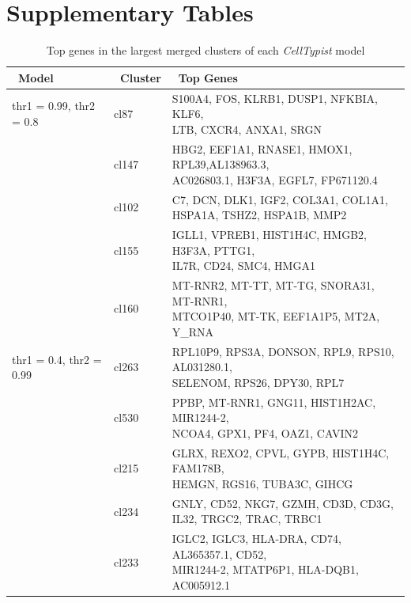 \section{Supplementary Tables}
\label{sectionB1.2}

\begin{table}[ht!] %
\footnotesize
\caption[Top genes in the largest merged clusters of each \textit{CellTypist} model]{Top genes in the largest merged clusters of each \textit{CellTypist} model}
\centering
\label{table:tab_appB_clgenes}

\begin{tabular}{l|l|l}
\toprule
~\textbf{Model} & ~\textbf{Cluster} & ~\textbf{Top Genes} \\
\midrule
thr1 = 0.99, thr2 = 0.8 & cl87 & \specialcell[t]{S100A4, FOS, KLRB1, DUSP1, NFKBIA, KLF6,\\LTB, CXCR4, ANXA1, SRGN} \\
 & cl147 & \specialcell[t]{HBG2, EEF1A1, RNASE1, HMOX1, RPL39,AL138963.3,\\AC026803.1, H3F3A, EGFL7, FP671120.4}  \\
 & cl102 & \specialcell[t]{C7, DCN, DLK1, IGF2, COL3A1, COL1A1,\\HSPA1A, TSHZ2, HSPA1B, MMP2} \\
 & cl155 & \specialcell[t]{IGLL1, VPREB1, HIST1H4C, HMGB2, H3F3A, PTTG1,\\IL7R, CD24, SMC4, HMGA1} \\
 & cl160 & \specialcell[t]{MT-RNR2, MT-TT, MT-TG, SNORA31, MT-RNR1,\\MTCO1P40, MT-TK, EEF1A1P5, MT2A, Y\_RNA} \\
 
\midrule
thr1 = 0.4, thr2 = 0.99 & cl263 & \specialcell[t]{RPL10P9, RPS3A, DONSON, RPL9, RPS10, AL031280.1,\\SELENOM, RPS26, DPY30, RPL7}  \\
 & cl530 & \specialcell[t]{PPBP, MT-RNR1, GNG11, HIST1H2AC, MIR1244-2,\\NCOA4, GPX1, PF4, OAZ1, CAVIN2}  \\
 & cl215 & \specialcell[t]{GLRX, REXO2, CPVL, GYPB, HIST1H4C, FAM178B,\\HEMGN, RGS16, TUBA3C, GIHCG}  \\
 & cl234 & \specialcell[t]{GNLY, CD52, NKG7, GZMH, CD3D, CD3G,\\IL32, TRGC2, TRAC, TRBC1}  \\
 & cl233 & \specialcell[t]{IGLC2, IGLC3, HLA-DRA, CD74, AL365357.1, CD52,\\ MIR1244-2, MTATP6P1, HLA-DQB1, AC005912.1}  \\
 

\end{tabular}
\end{table}
